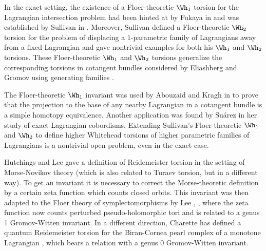 In the exact setting, the existence of a Floer-theoretic $\Wh_1$ torsion for the Lagran\-gian intersection problem had been hinted at by Fukaya in \cite{F95} and was established by Sullivan in \cite{S02}. Moreover, Sullivan defined a Floer-theoretic $\Wh_2$ torsion for the problem of displacing a $1$-parametric family of Lagrangians away from a fixed Lagrangian and gave nontrivial examples for both his $\Wh_1$ and $\Wh_2$ torsions. These Floer-theoretic $\Wh_1$ and $\Wh_2$ torsions generalize the corresponding torsions in cotangent bundles considered by Eliashberg and Gromov using generating families \cite{EG98}.

The Floer-theoretic $\Wh_1$ invariant was used by Abouzaid and Kragh in \cite{AK18} to prove that the projection to the base of any nearby Lagrangian in a cotangent bundle is a simple homotopy equivalence. Another application was found by Suárez \cite{S17} in her study of exact Lagrangian cobordisms. Extending Sullivan's Floer-theoretic $\Wh_1$ and $\Wh_2$ to define higher Whitehead torsions of higher parametric families of Lagrangians is a nontrivial open problem, even in the exact case.

Hutchings and Lee gave a definition of Reidemeister torsion in the setting of Morse-Novikov theory \cite{HL99} (which is also related to Turaev torsion, but in a different way). To get an invariant it is necessary to correct the Morse-theoretic definition by a certain zeta function which counts closed orbits. This invariant was then adapted to the Floer theory of symplectomorphisms by Lee \cite{L05a}, \cite{L05b}, where the zeta function now counts perturbed pseudo-holomorphic tori and is related to a genus 1 Gromov-Witten invariant. In a different direction, Charette has defined a quantum Reidemeister torsion for the Biran-Cornea pearl complex of a monotone Lagrangian \cite{C17}, which bears a relation with a genus 0 Gromov-Witten invariant.

